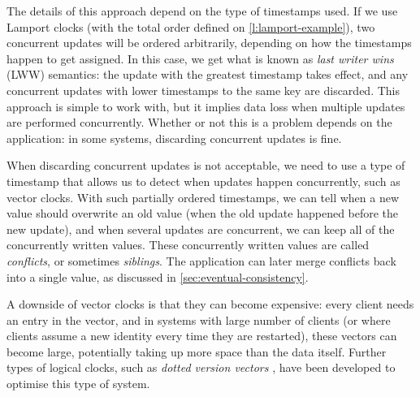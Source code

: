 \label{l:concurrent-writes}

The details of this approach depend on the type of timestamps used.
If we use Lamport clocks (with the total order defined on \autoref{l:lamport-example}), two concurrent updates will be ordered arbitrarily, depending on how the timestamps happen to get assigned.
In this case, we get what is known as \emph{last writer wins} (LWW) semantics: the update with the greatest timestamp takes effect, and any concurrent updates with lower timestamps to the same key are discarded.
This approach is simple to work with, but it implies data loss when multiple updates are performed concurrently.
Whether or not this is a problem depends on the application: in some systems, discarding concurrent updates is fine.

When discarding concurrent updates is not acceptable, we need to use a type of timestamp that allows us to detect when updates happen concurrently, such as vector clocks.
With such partially ordered timestamps, we can tell when a new value should overwrite an old value (when the old update happened before the new update), and when several updates are concurrent, we can keep all of the concurrently written values.
These concurrently written values are called \emph{conflicts}, or sometimes \emph{siblings}.
The application can later merge conflicts back into a single value, as discussed in \autoref{sec:eventual-consistency}.

A downside of vector clocks is that they can become expensive: every client needs an entry in the vector, and in systems with large number of clients (or where clients assume a new identity every time they are restarted), these vectors can become large, potentially taking up more space than the data itself.
Further types of logical clocks, such as \emph{dotted version vectors} \citep{Preguica:2010}, have been developed to optimise this type of system.


